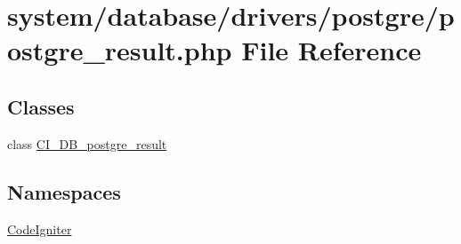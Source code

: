 \hypertarget{postgre__result_8php}{}\section{system/database/drivers/postgre/postgre\+\_\+result.php File Reference}
\label{postgre__result_8php}
\subsection*{Classes}
\begin{DoxyCompactItemize}
\item 
class \mbox{\hyperlink{class_c_i___d_b__postgre__result}{C\+I\+\_\+\+D\+B\+\_\+postgre\+\_\+result}}
\end{DoxyCompactItemize}
\subsection*{Namespaces}
\begin{DoxyCompactItemize}
\item 
 \mbox{\hyperlink{namespace_code_igniter}{Code\+Igniter}}
\end{DoxyCompactItemize}
